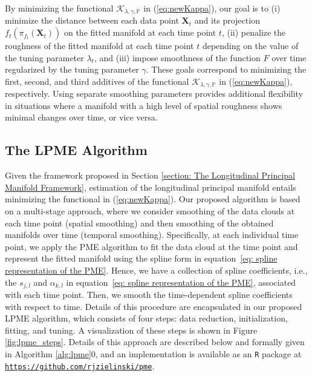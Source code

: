 \documentclass[12pt]{article}
\newcommand{\blind}{0}
\theoremstyle{definition}
\begin{document}
By minimizing the functional $\mathcal{K}_{\lambda, \gamma, \mathbb{P}}$ in (\ref{eq:newKappa}), our goal is to (i) minimize the distance between each data point $\mathbf{X}_t$ and its projection $f_t\left(\pi_{f_t}(\mathbf{X}_t)\right)$ on the fitted manifold at each time point $t$, (ii) penalize the roughness of the fitted manifold at each time point $t$ depending on the value of the tuning parameter $\lambda_t$, and (iii) impose smoothness of the function $F$ over time regularized by the tuning parameter $\gamma$. These goals correspond to minimizing the first, second, and third additives of the functional $\mathcal{K}_{\lambda, \gamma, \mathbb{P}}$ in (\ref{eq:newKappa}), respectively. Using separate smoothing parameters provides additional flexibility in situations where a manifold with a high level of spatial roughness shows minimal changes over time, or vice versa.







\subsection{The LPME Algorithm}

Given the framework proposed in Section \ref{section: The Longitudinal Principal Manifold Framework}, estimation of the longitudinal principal manifold entails minimizing the functional in (\ref{eq:newKappa}). Our proposed algorithm is based on a multi-stage approach, where we consider smoothing of the data clouds at each time point (spatial smoothing) and then smoothing of the obtained manifolds over time (temporal smoothing). Specifically, at each individual time point, we apply the PME algorithm \citep[alg. 2]{mengPrincipalManifoldEstimation2021} to fit the data cloud at the time point and represent the fitted manifold using the spline form in equation~\eqref{eq: spline representation of the PME}. Hence, we have a collection of spline coefficients, i.e., the $s_{j,l}$ and $\alpha_{k,l}$ in equation~\eqref{eq: spline representation of the PME}, associated with each time point. Then, we smooth the time-dependent spline coefficients with respect to time. Details of this procedure are encapsulated in our proposed LPME algorithm, which consists of four steps: data reduction, initialization, fitting, and tuning. A visualization of these steps is shown in Figure \ref{fig:lpme_steps}. Details of this approach are described below and formally given in Algorithm \ref{alg:lpme}\blind{, and an implementation is available as an \texttt{R} package at \href{https://github.com/rjzielinski/pme}{\texttt{https://github.com/rjzielinski/pme}}}\fi.
\end{document}
